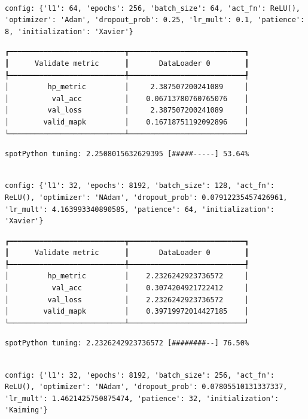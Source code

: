 \documentclass[
  letterpaper,
  DIV=11,
  numbers=noendperiod]{scrreprt}
\begin{document}
\begin{verbatim}

config: {'l1': 64, 'epochs': 256, 'batch_size': 64, 'act_fn': ReLU(), 'optimizer': 'Adam', 'dropout_prob': 0.25, 'lr_mult': 0.1, 'patience': 8, 'initialization': 'Xavier'}
\end{verbatim}

\begin{verbatim}
┏━━━━━━━━━━━━━━━━━━━━━━━━━━━┳━━━━━━━━━━━━━━━━━━━━━━━━━━━┓
┃      Validate metric      ┃       DataLoader 0        ┃
┡━━━━━━━━━━━━━━━━━━━━━━━━━━━╇━━━━━━━━━━━━━━━━━━━━━━━━━━━┩
│         hp_metric         │     2.387507200241089     │
│          val_acc          │    0.06713780760765076    │
│         val_loss          │     2.387507200241089     │
│        valid_mapk         │    0.16718751192092896    │
└───────────────────────────┴───────────────────────────┘
\end{verbatim}

\begin{verbatim}
spotPython tuning: 2.2508015632629395 [#####-----] 53.64% 
\end{verbatim}

\begin{verbatim}

config: {'l1': 32, 'epochs': 8192, 'batch_size': 128, 'act_fn': ReLU(), 'optimizer': 'NAdam', 'dropout_prob': 0.07912235457426961, 'lr_mult': 4.163993340890585, 'patience': 64, 'initialization': 'Xavier'}
\end{verbatim}

\begin{verbatim}
┏━━━━━━━━━━━━━━━━━━━━━━━━━━━┳━━━━━━━━━━━━━━━━━━━━━━━━━━━┓
┃      Validate metric      ┃       DataLoader 0        ┃
┡━━━━━━━━━━━━━━━━━━━━━━━━━━━╇━━━━━━━━━━━━━━━━━━━━━━━━━━━┩
│         hp_metric         │    2.2326242923736572     │
│          val_acc          │    0.3074204921722412     │
│         val_loss          │    2.2326242923736572     │
│        valid_mapk         │    0.39719972014427185    │
└───────────────────────────┴───────────────────────────┘
\end{verbatim}

\begin{verbatim}
spotPython tuning: 2.2326242923736572 [########--] 76.50% 
\end{verbatim}

\begin{verbatim}

config: {'l1': 32, 'epochs': 8192, 'batch_size': 256, 'act_fn': ReLU(), 'optimizer': 'NAdam', 'dropout_prob': 0.07805510131337337, 'lr_mult': 1.4621425750875474, 'patience': 32, 'initialization': 'Kaiming'}
\end{verbatim}
\end{document}
